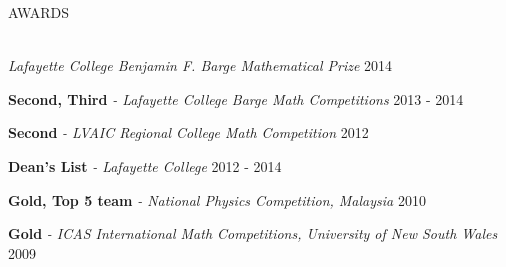 \documentclass{resume} %
\begin{document}

\begin{rSection}{AWARDS}
{\setlength{\parskip}{1.8pt}

\ \\
{\sl Lafayette College Benjamin F. Barge Mathematical Prize} \hfill 2014

{\bf Second, Third }{\sl - Lafayette College Barge Math Competitions } \hfill 2013 - 2014

{\bf Second }{\sl - LVAIC Regional College Math Competition} \hfill  2012

{\bf Dean's List }{\sl - Lafayette College} \hfill 2012 - 2014

{\bf Gold, Top 5 team }{\sl - National Physics Competition, Malaysia} \hfill 2010 

{\bf Gold }{\sl - ICAS International Math Competitions, University of New South Wales} \hfill  2009}
\end{rSection}








% 
% 
\end{document}
